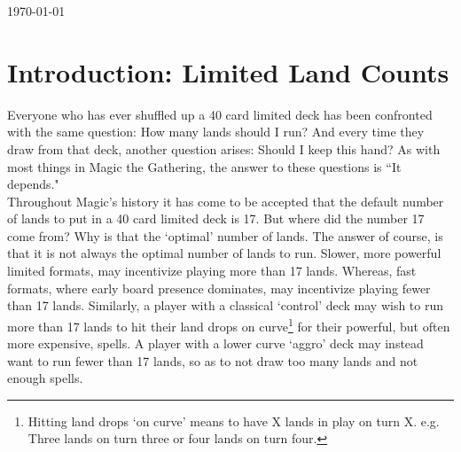 \documentclass[oneside]{book}   %
\begin{document}
\begin{titlepage}
	\vfill\vfill\vfill %
	
	{\large\today} %
	
	
	 
	
	\vfill %
	
\end{titlepage}

\tableofcontents
 
\listoffigures

\listoftables
 
\mainmatter
 
\chapter{Introduction: Limited Land Counts}
\label{intro}

Everyone who has ever shuffled up a 40 card limited deck has been confronted with the same question: How many lands should I run? And every time they draw from that deck, another question arises: Should I keep this hand? As with most things in Magic the Gathering, the answer to these questions is ``It depends."\\

Throughout Magic's history it has come to be accepted that the default number of lands to put in a 40 card limited deck is 17. But where did the number 17 come from? Why is that the `optimal' number of lands. The answer of course, is that it is not always the optimal number of lands to run. Slower, more powerful limited formats, may incentivize playing more than 17 lands. Whereas, fast formats, where early board presence dominates, may incentivize playing fewer than 17 lands. Similarly, a player with a classical `control' deck may wish to run more than 17 lands to hit their land drops on curve\footnote{Hitting land drops `on curve' means to have X lands in play on turn X. e.g. Three lands on turn three or four lands on turn four.} for their powerful, but often more expensive, spells. A player with a lower curve `aggro' deck may instead want to run fewer than 17 lands, so as to not draw too many lands and not enough spells. \\
\end{document}
